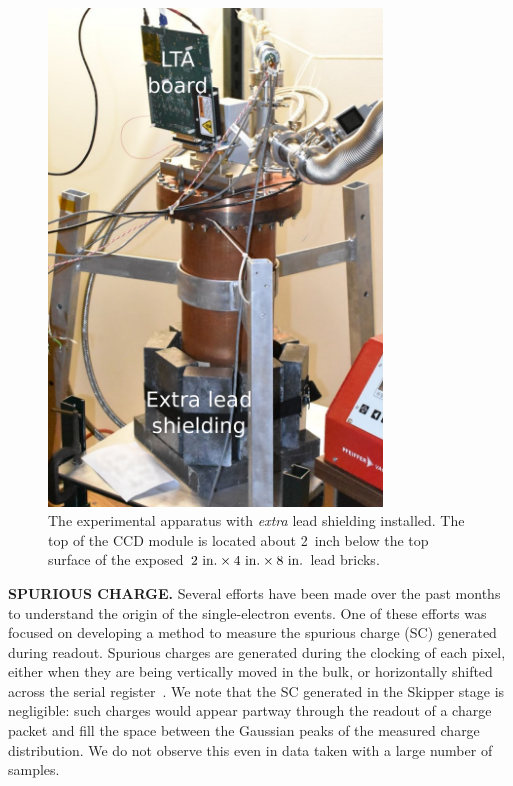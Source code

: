 \documentclass[aps,prl,twocolumn,showpacs,superscriptaddress,preprintnumbers]{revtex4-1}
\begin{document}
\begin{figure}[t!]
\begin{center}
\includegraphics[width=0.79\textwidth]{MINOS_setup.pdf}
\caption{The experimental apparatus with {\it extra} lead shielding installed. The top of the CCD module is located about 2~inch below the top surface of the exposed $2~{\rm in.} \times 4~{\rm in.} \times 8~{\rm in.}$ lead bricks. 
\vspace{-5mm}}
\label{fig:setup}
\end{center}
\end{figure}

\noindent \textbf{SPURIOUS CHARGE.}
Several efforts have been made over the past months to understand the origin of the single-electron events. One of these efforts was focused on developing a method to measure the spurious charge (SC) generated during readout. Spurious charges are generated during the clocking of each pixel, either when they are being vertically moved in the bulk, or horizontally shifted across the serial register~\cite{janesick2001scientific,Haro:2016}. We note that the SC generated in the Skipper stage is negligible: such charges would appear partway through the readout of a charge packet and fill the space between the Gaussian peaks of the measured charge distribution. We do not observe this even in data taken with a large number of samples.
\end{document}
